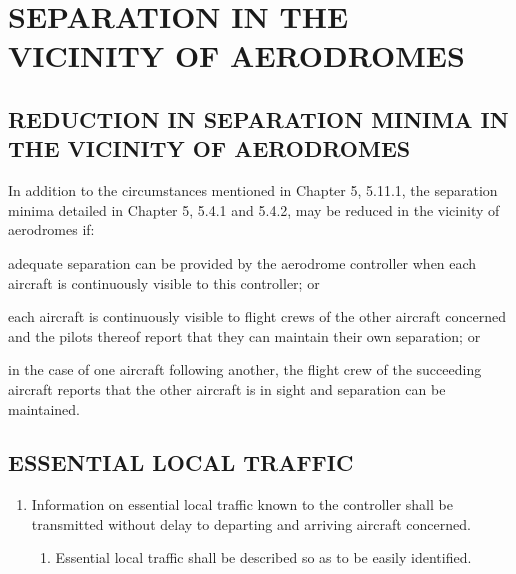 \documentclass[../main.tex]{subfiles}
\begin{document}
    \thispagestyle{1page}
    
    \section[Separation in the Vicinity of Aerodromes]{\texorpdfstring{SEPARATION IN THE VICINITY OF AERODROMES}{}}

    \subsection[Reduction in separation minima in the vicinity of aerodromes]{REDUCTION IN SEPARATION MINIMA IN \\ THE VICINITY OF AERODROMES}

    In addition to the circumstances mentioned in Chapter 5, 5.11.1, the separation minima detailed in Chapter 5, 5.4.1 and 5.4.2, may be reduced in the vicinity of aerodromes if:

    \begin{enumalph}
        \item adequate separation can be provided by the aerodrome controller when each aircraft is continuously visible to this controller; or
        \item each aircraft is continuously visible to flight crews of the other aircraft concerned and the pilots thereof report that they can maintain their own separation; or
        \item in the case of one aircraft following another, the flight crew of the succeeding aircraft reports that the other aircraft is in sight and separation can be maintained.
    \end{enumalph}

    \subsection[Essential local traffic]{ESSENTIAL LOCAL TRAFFIC}

    \begin{enumerate}[label=\arabic{section}.\arabic{subsection}.\arabic*]
        \item Information on essential local traffic known to the controller shall be transmitted without delay to departing and arriving aircraft concerned.



        \begin{enumerate}[label=\arabic{section}.\arabic{subsection}.\arabic{enumi}.\arabic*]
            \item Essential local traffic shall be described so as to be easily identified.
        \end{enumerate}
    \end{enumerate}
\end{document}
